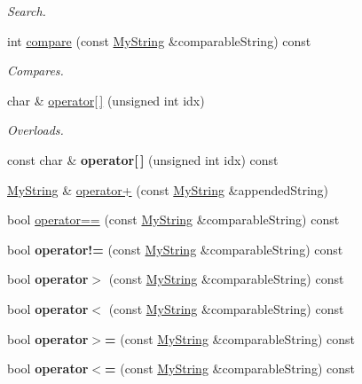 \begin{DoxyCompactItemize}
\begin{DoxyCompactList}\small\item\em Search. \end{DoxyCompactList}\item 
int \hyperlink{classMyString_a57d2aa76b38785c8d4949a0ee0d2bcf8}{compare} (const \hyperlink{classMyString}{My\-String} \&comparable\-String) const 
\begin{DoxyCompactList}\small\item\em Compares. \end{DoxyCompactList}\item 
char \& \hyperlink{classMyString_a05cc7418364db708e5932afc03033feb}{operator\mbox{[}$\,$\mbox{]}} (unsigned int idx)
\begin{DoxyCompactList}\small\item\em Overloads. \end{DoxyCompactList}\item 
\hypertarget{classMyString_a8d4854e7d5cefd9490a62304756317a6}{const char \& {\bfseries operator\mbox{[}$\,$\mbox{]}} (unsigned int idx) const }\label{classMyString_a8d4854e7d5cefd9490a62304756317a6}

\item 
\hyperlink{classMyString}{My\-String} \& \hyperlink{classMyString_adc73d01d26acedfc6817ca51d5b9ddef}{operator+} (const \hyperlink{classMyString}{My\-String} \&appended\-String)
\item 
bool \hyperlink{classMyString_a63a7af44a73ef9a0dd81527c8f0ec161}{operator==} (const \hyperlink{classMyString}{My\-String} \&comparable\-String) const 
\item 
\hypertarget{classMyString_aaad9fb6726a1459a971569aef1717b7e}{bool {\bfseries operator!=} (const \hyperlink{classMyString}{My\-String} \&comparable\-String) const }\label{classMyString_aaad9fb6726a1459a971569aef1717b7e}

\item 
\hypertarget{classMyString_a32135fa3dd2640e5f861759d71c0cbed}{bool {\bfseries operator$>$} (const \hyperlink{classMyString}{My\-String} \&comparable\-String) const }\label{classMyString_a32135fa3dd2640e5f861759d71c0cbed}

\item 
\hypertarget{classMyString_a64d0015a39e4edd433d4744c535c82fa}{bool {\bfseries operator$<$} (const \hyperlink{classMyString}{My\-String} \&comparable\-String) const }\label{classMyString_a64d0015a39e4edd433d4744c535c82fa}

\item 
\hypertarget{classMyString_a33bb1de467f6c0a387817623098f89c4}{bool {\bfseries operator$>$=} (const \hyperlink{classMyString}{My\-String} \&comparable\-String) const }\label{classMyString_a33bb1de467f6c0a387817623098f89c4}

\item 
\hypertarget{classMyString_a45a58bf09f5989a620dfa28f4b39ee22}{bool {\bfseries operator$<$=} (const \hyperlink{classMyString}{My\-String} \&comparable\-String) const }\label{classMyString_a45a58bf09f5989a620dfa28f4b39ee22}

\end{DoxyCompactItemize}


